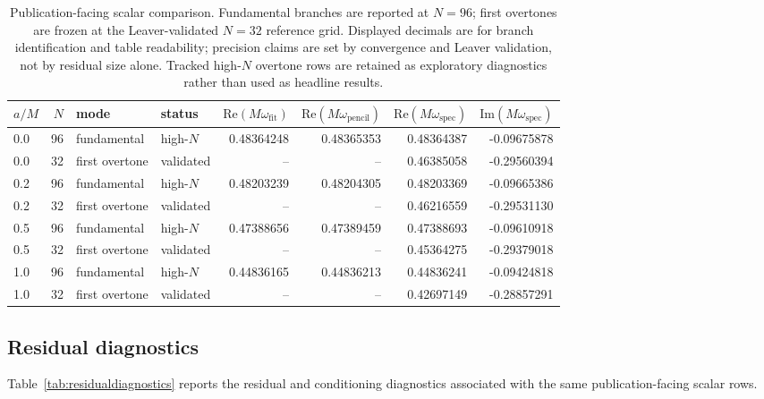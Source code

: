 ﻿\documentclass[12pt,a4paper]{article}
\begin{document}
\begin{table}[H]
\centering
\footnotesize
\renewcommand{\arraystretch}{1.16}
\begin{tabular}{lrllrrrr}
\toprule
\(a/M\) & \(N\) & mode & status &
\(\mathrm{Re}(M\omega_{\mathrm{fit}})\) &
\(\mathrm{Re}(M\omega_{\mathrm{pencil}})\) &
\(\mathrm{Re}(M\omega_{\mathrm{spec}})\) &
\(\mathrm{Im}(M\omega_{\mathrm{spec}})\)\\
\midrule
0.0 & 96 & fundamental & high-\(N\) & 0.48364248 & 0.48365353 & 0.48364387 & -0.09675878\\
0.0 & 32 & first overtone & validated & -- & -- & 0.46385058 & -0.29560394\\
0.2 & 96 & fundamental & high-\(N\) & 0.48203239 & 0.48204305 & 0.48203369 & -0.09665386\\
0.2 & 32 & first overtone & validated & -- & -- & 0.46216559 & -0.29531130\\
0.5 & 96 & fundamental & high-\(N\) & 0.47388656 & 0.47389459 & 0.47388693 & -0.09610918\\
0.5 & 32 & first overtone & validated & -- & -- & 0.45364275 & -0.29379018\\
1.0 & 96 & fundamental & high-\(N\) & 0.44836165 & 0.44836213 & 0.44836241 & -0.09424818\\
1.0 & 32 & first overtone & validated & -- & -- & 0.42697149 & -0.28857291\\
\bottomrule
\end{tabular}
\caption{Publication-facing scalar comparison. Fundamental branches are reported at \(N=96\); first overtones are frozen at the Leaver-validated \(N=32\) reference grid. Displayed decimals are for branch identification and table readability; precision claims are set by convergence and Leaver validation, not by residual size alone. Tracked high-\(N\) overtone rows are retained as exploratory diagnostics rather than used as headline results.}
\label{tab:spectralresults}
\end{table}

\subsection{Residual diagnostics}

Table~\ref{tab:residualdiagnostics} reports the residual and conditioning diagnostics associated with the same publication-facing scalar rows.
\end{document}
